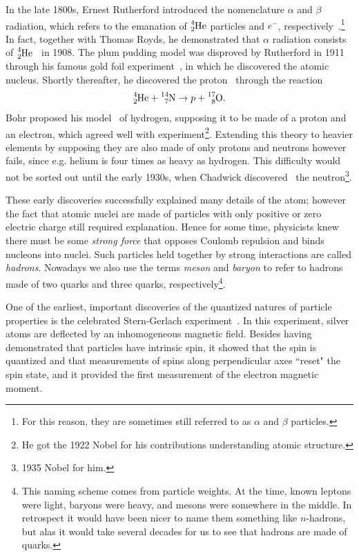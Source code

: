 In the late 1800s, Ernest Rutherford introduced the nomenclature $\alpha$ and
$\beta$ radiation, which refers to the emanation of $\ce{^4_2He}$ particles
and $e^-$, respectively~\cite{rutherford_uranium_1899}.\footnote{For this
reason, they are sometimes still referred to as $\alpha$ and $\beta$
particles.} In fact, together with
Thomas Royds, he demonstrated that $\alpha$ radiation consists of 
$\ce{^4_2He}$~\cite{rutherford_spectrum_1908} in 1908. The plum pudding model was
disproved by Rutherford in 1911 through his famous gold foil
experiment~\cite{rutherford_scattering_1911}, in which he discovered
the atomic nucleus. Shortly thereafter, he discovered the
proton~\cite{rutherford_collision_1919} through the reaction
\begin{equation}
\ce{^4_2He}+\ce{^{14}_7N}\to p+\ce{^{17}_8O}.
\end{equation}
Bohr proposed his model~\cite{bohr_constitution_1913}
of hydrogen, supposing it to be made of a proton and an electron, which agreed
well with experiment\footnote{He got the 1922 Nobel for his
contributions understanding atomic structure.}. Extending this theory to 
heavier elements by supposing
they are also made of only protons and neutrons however fails, since e.g. helium
is four times as heavy as hydrogen. This difficulty would not be sorted out
until the early 1930s, when Chadwick discovered~\cite{chadwick_possible_1932}
the neutron\footnote{1935 Nobel for him.}.


These early discoveries successfully explained many details of the atom; however
the fact that atomic nuclei are made of particles with only positive or zero
electric charge still required explanation.
Hence for some time, physicists
knew there must be some {\it strong force} that opposes
Coulomb repulsion and binds nucleons into nuclei.
Such particles held together by strong interactions are called
{\it hadrons}. Nowadays we also use the terms {\it meson}
 and {\it baryon} to refer to hadrons made of
two quarks and three quarks, respectively\footnote{This naming scheme
comes from particle weights. At the time, known leptons were light, 
baryons were heavy, and mesons were somewhere in the middle. In retrospect it
would have been nicer to name them something like $n$-hadrons, but alas it would
take several decades for us to see that hadrons are made of quarks.}.


One of the earliest, important discoveries of the quantized natures of particle
properties is the celebrated Stern-Gerlach
experiment~\cite{gerlach_experimentelle_1922a,gerlach_magnetische_1922b,gerlach_experimentelle_1922c}. 
In this experiment, silver atoms
are deflected by an inhomogeneous magnetic field.
Besides having demonstrated that particles have intrinsic spin, it showed that
the spin is quantized and that measurements of spins along perpendicular axes
``reset" the spin state, and it provided the first measurement of the electron
magnetic moment.


